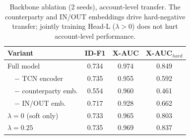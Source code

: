 \documentclass[conference]{IEEEtran}
\begin{document}
\begin{table}[t]\centering\caption{Marginal value of the learned attention in the SOTA content-aware fusion (identical LOO protocol, $n{=}101$). Engineered features alone reach Hit@1 0.792--0.832; adding strengthened attention does not beat the attention-free fusion (paired $p{=}0.68$). Attention is a useful but non-essential signal.}\label{tab:attn}
\end{table}

\begin{table}[t]\centering\caption{Backbone ablation (2 seeds), account-level
transfer. The counterparty and IN/OUT embeddings drive hard-negative transfer;
jointly training Head-L ($\lambda{>}0$) does not hurt account-level
performance.}\label{tab:abl}
\begin{tabular}{lccc}\toprule
\textbf{Variant} & \textbf{ID-F1} & \textbf{X-AUC} & \textbf{X-AUC$_{hard}$} \\\midrule
Full model & 0.734 & 0.974 & 0.849 \\
\ \ $-$ TCN encoder & 0.735 & 0.955 & 0.592 \\
\ \ $-$ counterparty emb. & 0.554 & 0.960 & 0.461 \\
\ \ $-$ IN/OUT emb. & 0.717 & 0.928 & 0.662 \\
$\lambda{=}0$ (soft only) & 0.733 & 0.965 & 0.803 \\
$\lambda{=}0.25$ & 0.735 & 0.969 & 0.837 \\
\bottomrule\end{tabular}\end{table}
\end{document}
